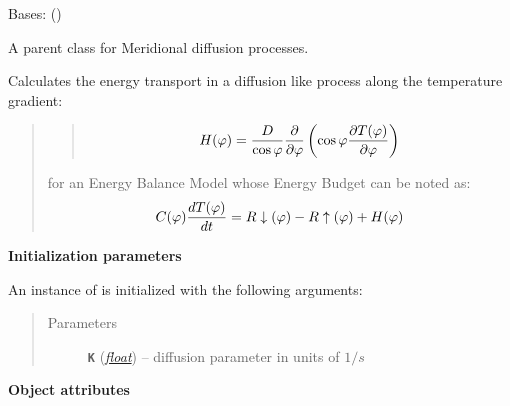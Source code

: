 \documentclass[a4paper,10pt,english]{sphinxmanual}
\begin{document}
\begin{fulllineitems}
\label{api/climlab.dynamics:climlab.dynamics.diffusion.MeridionalDiffusion}
Bases: {\hyperref[api/climlab.dynamics:climlab.dynamics.diffusion.Diffusion]{\emph{}}} ()

A parent class for Meridional diffusion processes.

Calculates the energy transport in a diffusion like process along the
temperature gradient:
\begin{quote}
\begin{quote}
\begin{gather}
\begin{split}H(\varphi) = \frac{D}{\cos \varphi}\frac{\partial}{\partial \varphi} \left( \cos\varphi \frac{\partial T(\varphi)}{\partial \varphi} \right)\end{split}\notag
\end{gather}\end{quote}

for an Energy Balance Model whose Energy Budget can be noted as:
\begin{gather}
\begin{split}C(\varphi) \frac{dT(\varphi)}{dt} = R\downarrow (\varphi) - R\uparrow (\varphi) + H(\varphi)\end{split}\notag
\end{gather}\end{quote}

\textbf{Initialization parameters}

An instance of  is initialized with the following 
arguments:
\begin{quote}\begin{description}
\item[{Parameters}] \leavevmode
\textbf{\texttt{K}} (\href{http://docs.python.org/2.7/library/functions.html\#float}{\emph{float}}) -- diffusion parameter in units of \(1/s\)

\end{description}\end{quote}

\textbf{Object attributes}


\end{fulllineitems}
\end{document}
